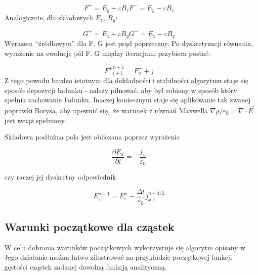     \begin{equation}
        F^{+} = E_y + c B_z
        F^{-} = E_y - c B_z
        \label{eqn:Birdsall-electromagnetic-quantities}
    \end{equation}
    Analogicznie, dla składowych $E_z$, $B_y$:

    \begin{equation}
        G^{+} = E_z + c B_y
        G^{-} = E_z - c B_y
        \label{eqn:Birdsall-electromagnetic-quantities-alternate-axes}
    \end{equation}
    Wyrazem ``źródłowym'' dla F, G jest prąd poprzeczny. Po dyskretyzacji
    równania, wyrażenie na ewolucję pól F, G między iteracjami przybiera
    postać:

    \begin{equation}
        {F^{+}}^{n+1}_{i+1} = F^{+}_{n} + j
    \end{equation}
    Z tego powodu bardzo istotnym dla dokładności i stabilności algorytmu staje
    się sposób depozycji ładunku - należy pilnować, aby był robiony w sposób
    który spełnia zachowanie ładunku. Inaczej koniecznym staje się aplikowanie
    tak zwanej poprawki Borysa, 
    aby upewnić się, że warunek z równań Maxwella $\nabla \rho / \varepsilon_0
    = \nabla \cdot \vec{E}$ jest wciąż spełniony.

    Składowa podłużna pola jest obliczana poprzez wyrażenie

    \begin{equation}
    \frac{\partial E_x}{\partial t} = - \frac{j_x}{\varepsilon_0}
    \label{longitudinal-field-differential}
    \end{equation}

    czy raczej jej dyskretny odpowiednik

    \begin{equation}
        E_i^{n+1} = E_i^n - \frac{\Delta t}{\varepsilon_0} j_{x,i}^{n+1/2}
    \label{longitudinal-field-finite-differential}
    \end{equation}


    \subsection{Warunki początkowe dla cząstek}

    W celu dobrania warunków początkowych wykorzystuje się algorytm opisany w
     Jego działanie można łatwo zilustrować na
    przykładzie początkowej funkcji gęstości cząstek zadanej dowolną funkcją
    analityczną. 


